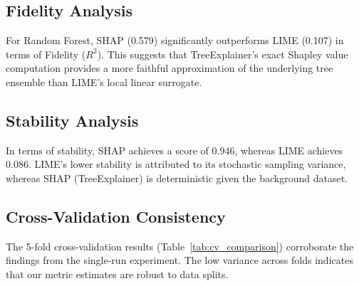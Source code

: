 \subsection{Fidelity Analysis}
For Random Forest, SHAP (0.579) significantly outperforms LIME (0.107) in terms of Fidelity ($R^2$). This suggests that TreeExplainer's exact Shapley value computation provides a more faithful approximation of the underlying tree ensemble than LIME's local linear surrogate.
\subsection{Stability Analysis}
In terms of stability, SHAP achieves a score of 0.946, whereas LIME achieves 0.086. LIME's lower stability is attributed to its stochastic sampling variance, whereas SHAP (TreeExplainer) is deterministic given the background dataset.
\subsection{Cross-Validation Consistency}
The 5-fold cross-validation results (Table~\ref{tab:cv_comparison}) corroborate the findings from the single-run experiment. The low variance across folds indicates that our metric estimates are robust to data splits.